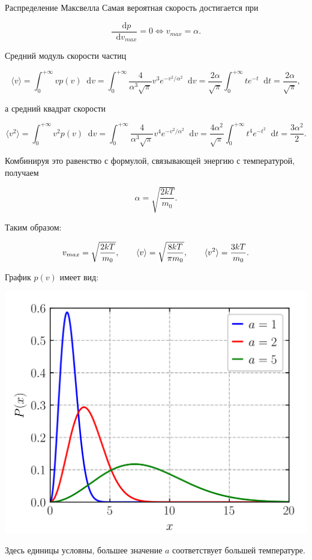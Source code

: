 \documentclass{article}
\renewcommand{\d}{\mathop{}\!\mathrm{d}}
\begin{document}
\begin{section}{Распределение Максвелла}
		Самая вероятная скорость достигается при

		\begin{equation*}
			\frac{\d p}{\d v_{max}} = 0 \iff v_{max} = \alpha.
		\end{equation*}

		Средний модуль скорости частиц

		\begin{equation*}
			\langle v \rangle = \int_{0}^{+\infty} v p(v) \d v = \int_0^{+\infty} \frac{4}{\alpha^3 \sqrt{\pi}} v^3 e^{-v^2 / \alpha^2} \d v = \frac{2 \alpha}{\sqrt{\pi}} \int_0^{+\infty} t e^{-t} \d t = \frac{2 \alpha}{\sqrt{\pi}},
		\end{equation*}

		а средний квадрат скорости

		\begin{equation*}
			\langle v^2 \rangle = \int_0^{+\infty} v^2 p(v) \d v = \int_0^{+\infty} \frac{4}{\alpha^3 \sqrt{\pi}} v^4 e^{-v^2 / \alpha^2} \d v = \frac{4 \alpha^2}{\sqrt{\pi}} \int_0^{+\infty} t^4 e^{-t^2} \d t = \frac{3 \alpha^2}{2}.
		\end{equation*}

		Комбинируя это равенство с формулой, связывающей энергию с температурой, получаем

		\begin{equation*}
			\alpha = \sqrt{\frac{2kT}{m_0}}.
		\end{equation*}

		Таким образом:

		\begin{equation*}
			v_{max} = \sqrt{\frac{2kT}{m_0}}, \qquad
			\langle v \rangle = \sqrt{\frac{8kT}{\pi m_0}}, \qquad
			\langle v^2 \rangle = \frac{3kT}{m_0}. \\
		\end{equation*}

		График $p(v)$ имеет вид:

		\includegraphics[width=\textwidth]{images/maxwelldistribution.png}

		Здесь единицы условны, большее значение $a$ соответствует большей температуре.
	\end{section}
\end{document}
